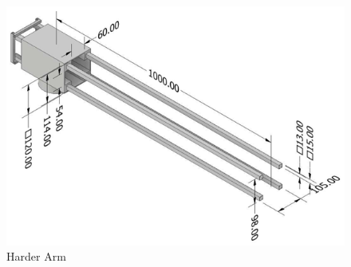 \documentclass[10pt,b5paper,papersize,dvipdfmx]{jsbook}
\begin{document}
\begin{figure}[htbp]
  \centering
  \includegraphics[width=.8\textwidth]{img/robot13.png}
  \caption{Harder Arm}
  \label{fig:Harder Arm}
\end{figure}
\end{document}
